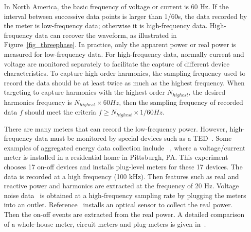 In North America, the basic frequency of voltage or current is
60 Hz. 
If the interval between successive data points is larger than 1/60s, 
the data recorded by the meter is low-frequency data; otherwise it is 
high-frequency data. 
High-frequency data can recover the waveform, as
illustrated in Figure~\ref{fig_threephase}.
In practice, only the apparent power
or real power is measured for low-frequency data.
For high-frequency data,
normally current and voltage are monitored separately to facilitate the capture of different device characteristics.
To capture high-order harmonics, the sampling frequency used to record the data
should be at least twice as much as the highest frequency.
When targeting to capture harmonics with the highest order $N_{highest}$, 
 the desired harmonics frequency is $N_{highest} \times 60 Hz$,
then the sampling frequency of recorded data $f$ should
meet the criteria $f \geq N_{highest} \times 1/60 Hz$. 

There are many meters that can record the low-frequency power.
However, high-frequency data must be monitored by special devices such as a TED~\cite{meterTED}.
Some examples of aggregated energy data collection include
~\cite{berges2010enhancing}, where a voltage/current meter is installed in a residential
home in Pittsburgh, PA.
This experiment chooses 17 on-off devices and installs plug-level meters for
these 17 devices. 
The data is recorded at a high frequency
(100 kHz). Then features such as real and reactive power and harmonics
are extracted at the frequency of 20 Hz.
Voltage noise data~\cite{patel2007flick} is obtained 
at a high-frequency sampling rate by
plugging the meters into an outlet. Reference~\cite{baranski2003nonintrusive} installs an
optical sensor 
to collect the real power. Then the on-off events are extracted 
from the real power.
A detailed comparison of
a whole-house meter, circuit meters and plug-meters 
is given in~\cite{berges2010enhancing}.


%

